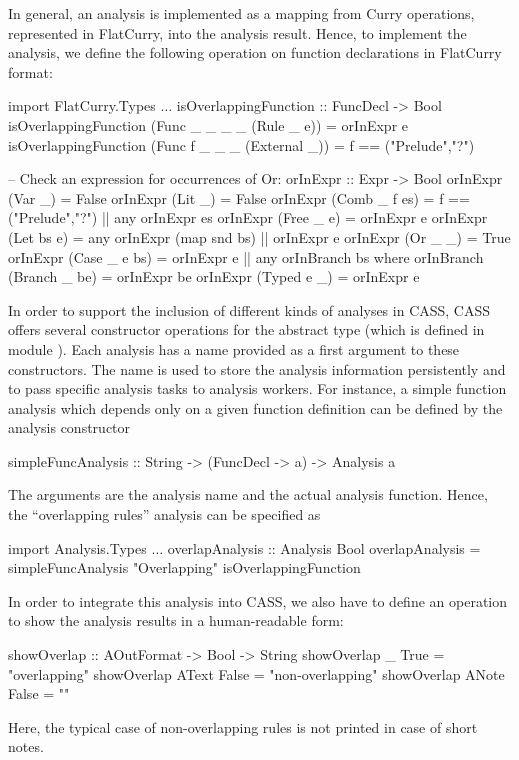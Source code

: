 In general, an analysis is implemented as a mapping from Curry operations,
represented in FlatCurry, into the analysis result.
Hence, to implement the  analysis, we define
the following operation on function declarations in FlatCurry format:
\begin{curry}
import FlatCurry.Types
$\ldots$
isOverlappingFunction :: FuncDecl -> Bool
isOverlappingFunction (Func _ _ _ _ (Rule _ e))   = orInExpr e
isOverlappingFunction (Func f _ _ _ (External _)) = f == ("Prelude","?")

-- Check an expression for occurrences of Or:
orInExpr :: Expr -> Bool
orInExpr (Var _)       = False
orInExpr (Lit _)       = False
orInExpr (Comb _ f es) = f == ("Prelude","?") || any orInExpr es
orInExpr (Free _ e)    = orInExpr e
orInExpr (Let bs e)    = any orInExpr (map snd bs) || orInExpr e
orInExpr (Or _ _)      = True
orInExpr (Case _ e bs) = orInExpr e || any orInBranch bs
 where orInBranch (Branch _ be) = orInExpr be
orInExpr (Typed e _)   = orInExpr e
\end{curry}
%
In order to support the inclusion of different kinds of analyses in CASS,
CASS offers several constructor operations for the abstract type
(which is defined in module ).
Each analysis has a name provided as a first argument
to these constructors. The name is used to store the
analysis information persistently and to pass specific analysis tasks
to analysis workers.
For instance, a simple function analysis which depends only on a
given function definition can be defined by the
analysis constructor
\begin{curry}
simpleFuncAnalysis :: String -> (FuncDecl -> a) -> Analysis a
\end{curry}
The arguments are the analysis name and the actual analysis function.
Hence, the ``overlapping rules'' analysis can be specified as
\begin{curry}
import Analysis.Types
$\ldots$
overlapAnalysis :: Analysis Bool
overlapAnalysis = simpleFuncAnalysis "Overlapping" isOverlappingFunction
\end{curry}
In order to integrate this analysis into CASS, we also have to
define an operation to show the analysis results in a human-readable form:
%
\begin{curry}
showOverlap :: AOutFormat -> Bool -> String
showOverlap _     True  = "overlapping"
showOverlap AText False = "non-overlapping"
showOverlap ANote False = ""
\end{curry}
%
Here, the typical case of non-overlapping rules is not printed
in case of short notes.

